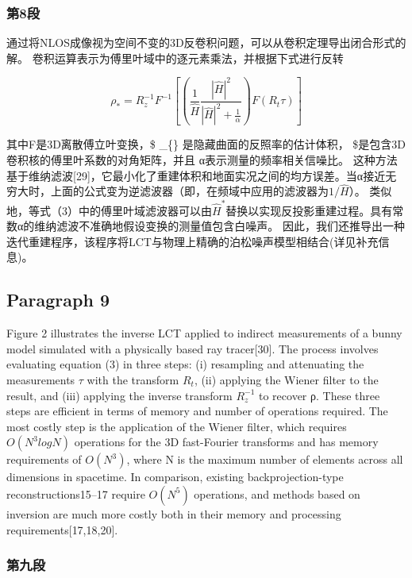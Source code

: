 \documentclass[11pt]{article}
\begin{document}
    \subsubsection{第8段}\label{ux7b2c8ux6bb5}

通过将NLOS成像视为空间不变的3D反卷积问题，可以从卷积定理导出闭合形式的解。
卷积运算表示为傅里叶域中的逐元素乘法，并根据下式进行反转

\[\rho_{\ast}=R_{z}^{-1}F^{-1}[(\frac{1}{\widehat{H}}\frac{|\widehat{H}|^{2}}{|\widehat{H}|^{2}+\frac{1}{\alpha}})F(R_{t}\tau)]\]

其中F是3D离散傅立叶变换，\$ \rho\_\{\ast\}
\(是隐藏曲面的反照率的估计体积，\) 
\$是包含3D卷积核的傅里叶系数的对角矩阵，并且 α表示测量的频率相关信噪比。
这种方法基于维纳滤波{[}29{]}，它最小化了重建体积和地面实况之间的均方误差。当α接近无穷大时，上面的公式变为逆滤波器（即，在频域中应用的滤波器为\(1/\hat {H}\)）。
类似地，等式（3）中的傅里叶域滤波器可以由\(\hat{H}^{\ast}\)替换以实现反投影重建过程。具有常数α的维纳滤波不准确地假设变换的测量值包含白噪声。
因此，我们还推导出一种迭代重建程序，该程序将LCT与物理上精确的泊松噪声模型相结合(详见补充信息)。

    \subsection{Paragraph 9}\label{paragraph-9}

Figure 2 illustrates the inverse LCT applied to indirect measurements of
a bunny model simulated with a physically based ray tracer{[}30{]}. The
process involves evaluating equation (3) in three steps: (i) resampling
and attenuating the measurements \(\tau\) with the transform \(R_t\),
(ii) applying the Wiener filter to the result, and (iii) applying the
inverse transform \(R_z^{-1}\) to recover ρ. These three steps are
efficient in terms of memory and number of operations required. The most
costly step is the application of the Wiener filter, which requires
\(O(N^{3}logN)\) operations for the 3D fast-Fourier transforms and has
memory requirements of \(O(N^3)\), where N is the maximum number of
elements across all dimensions in spacetime. In comparison, existing
backprojection-type reconstructions15--17 require \(O(N^5)\) operations,
and methods based on inversion are much more costly both in their memory
and processing requirements{[}17,18,20{]}.

    \subsubsection{第九段}\label{ux7b2cux4e5dux6bb5}
\end{document}
